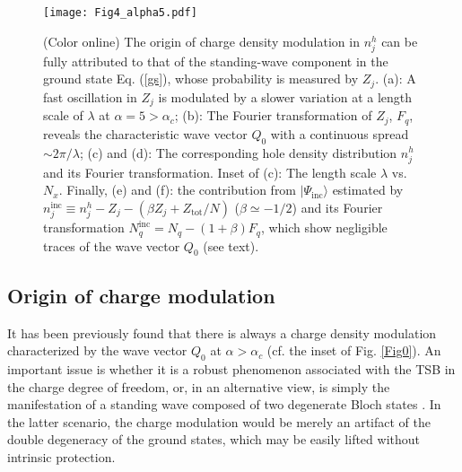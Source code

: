 \documentclass[aps,prb,twocolumn,notitlepage,superscriptaddress,showpacs]{revtex4-1}
\begin{document}
\begin{figure*}[tbp]
\begin{center}
\texttt{[image: Fig4\_alpha5.pdf]}
\end{center}
\par
\renewcommand{\figurename}{Fig.}
\caption{(Color online) The origin of charge density modulation in $n_j^h$ can be fully attributed to that of the standing-wave component in the ground state Eq. (\ref{gs}), whose probability is measured by $Z_j$. (a):  A fast oscillation in  $Z_j$ is modulated by a slower variation at a length scale of $\lambda$ at $\alpha=5>\alpha_c$; (b): The Fourier transformation of $Z_j$, $F_q$, reveals the characteristic wave vector $Q_0$ with a continuous spread $\sim 2\pi/\lambda$; (c) and (d): The corresponding hole density distribution $n_j^h$ and its Fourier transformation. Inset of (c): The length scale $\lambda$ vs. $N_x$. Finally, (e) and (f):  the contribution from $|\Psi_{\mathrm {inc}}\rangle $ estimated by $n_j^{\mathrm {inc}}\equiv n_j^h-Z_j-(\beta Z_j+Z_{\text{tot}}/N)$ ($\beta\simeq -1/2$) and its Fourier transformation $N_q^{\mathrm {inc}}=N_q-(1+\beta)F_q$, which show negligible traces of the wave vector $Q_0$ (see text).}
\label{Fig3}
\end{figure*}


\subsection{Origin of charge modulation}

It has been previously found \cite{ZZ2014cm} that there is always a charge density modulation characterized by the wave vector $Q_0$ at $\alpha>\alpha_c$ (cf. the inset of Fig. \ref{Fig0}). An important issue is whether it is a robust phenomenon associated with the TSB in the charge degree of freedom, or, in an alternative view, is simply the manifestation of a standing wave composed of two degenerate Bloch states \cite{WSK2015}. In the latter scenario, the charge modulation would be merely an artifact of the double degeneracy of the ground states, which may be easily lifted without intrinsic protection.
\end{document}
